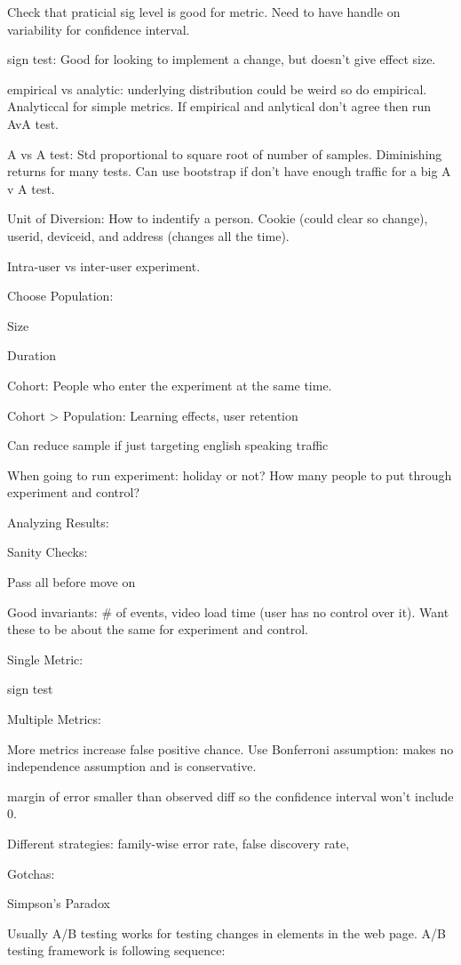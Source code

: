 \documentclass[]{book}
\begin{document}
Check that praticial sig level is good for metric. Need to have handle on variability for confidence interval.

sign test: Good for looking to implement a change, but doesn't give effect size.

empirical vs analytic: underlying distribution could be weird so do empirical. Analyticcal for simple metrics. If empirical and anlytical don't agree then run AvA test.

A vs A test: Std proportional to square root of number of samples. Diminishing returns for many tests. Can use bootstrap if don't have enough traffic for a big A v A test.

Unit of Diversion: How to indentify a person. Cookie (could clear so change), userid, deviceid, and address (changes all the time).

Intra-user vs inter-user experiment.

Choose Population:

Size

Duration

Cohort: People who enter the experiment at the same time.

Cohort \textgreater{} Population: Learning effects, user retention

Can reduce sample if just targeting english speaking traffic

When going to run experiment: holiday or not? How many people to put through experiment and control?

Analyzing Results:

Sanity Checks:

Pass all before move on

Good invariants: \# of events, video load time (user has no control over it). Want these to be about the same for experiment and control.

Single Metric:

sign test

Multiple Metrics:

More metrics increase false positive chance. Use Bonferroni assumption: makes no independence assumption and is conservative.

margin of error smaller than observed diff so the confidence interval won't include 0.

Different strategies: family-wise error rate, false discovery rate,

Gotchas:

Simpson's Paradox

Usually A/B testing works for testing changes in elements in the web page. A/B testing framework is following sequence:
\end{document}
